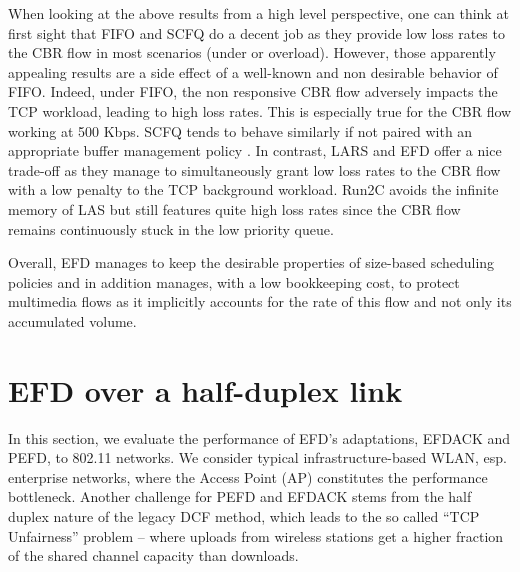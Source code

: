 \documentclass[preprint,12pt]{elsarticle}
\begin{document}
When looking at the above results from a high level perspective, one can think at first sight that FIFO and SCFQ do a decent job as they provide low loss rates to the CBR flow in most scenarios (under or overload). However, those apparently appealing results are a side effect of a well-known and non desirable behavior of FIFO. Indeed, under FIFO, the non responsive CBR flow adversely impacts the TCP workload, leading to high loss rates. This is especially true for the CBR flow working at 500 Kbps. SCFQ tends to behave similarly if  not paired with an appropriate buffer management policy \cite{Golestani94SCFQ}. In contrast, LARS and EFD offer a nice trade-off as they manage to simultaneously grant  low loss rates to the CBR flow with a low penalty to the TCP background workload. Run2C avoids the  infinite memory of LAS but still features quite high loss rates since the CBR flow remains continuously stuck in the low priority queue.


Overall, EFD manages to keep the desirable properties of size-based scheduling policies and in addition manages, with a low bookkeeping cost, to protect multimedia flows as it  implicitly accounts for the rate of this flow and not only its accumulated volume. 


\section{EFD over a half-duplex link}
\label{sec:perf_wlan}
In this section, we evaluate the performance of EFD's adaptations, EFDACK and PEFD,  to  802.11  networks. %
We consider  typical infrastructure-based WLAN, esp. enterprise networks, where the Access Point (AP) constitutes the performance bottleneck. Another challenge for PEFD and EFDACK stems from the half duplex nature of  the legacy DCF method, which %
leads to the so called ``TCP Unfairness'' \cite{Pilosof03understandingtcp} problem -- where uploads from wireless stations get a higher fraction of the shared channel capacity than downloads. 
\end{document}
